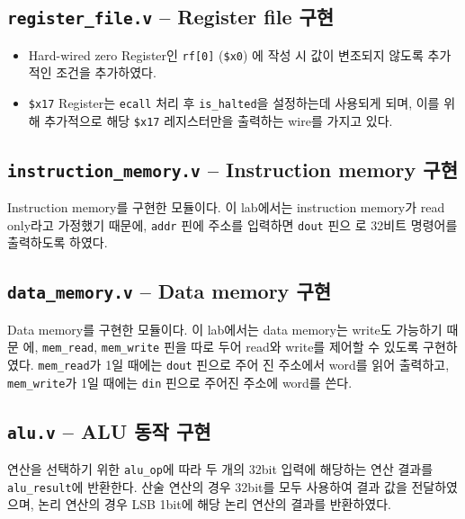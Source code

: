\documentclass{scrartcl}
\begin{document}
\subsection{\texttt{register\_file.v} -- Register file 구현}
\begin{itemize}
    \item Hard-wired zero Register인 \texttt{rf[0]} (\texttt{\$x0}) 에 작성 시 값이 변조되지 않도록
    추가적인 조건을 추가하였다.
    \item \texttt{\$x17} Register는 \texttt{ecall} 처리 후 \texttt{is\_halted}을 설정하는데
    사용되게 되며, 이를 위해 추가적으로 해당 \texttt{\$x17} 레지스터만을 출력하는 wire를 가지고 있다. 
\end{itemize}

\subsection{\texttt{instruction\_memory.v} -- Instruction memory 구현}
Instruction memory를 구현한 모듈이다. 이 lab에서는 instruction memory가 read
only라고 가정했기 때문에, \texttt{addr} 핀에 주소를 입력하면 \texttt{dout} 핀으
로 32비트 명령어를 출력하도록 하였다.

\subsection{\texttt{data\_memory.v} -- Data memory 구현}
Data memory를 구현한 모듈이다. 이 lab에서는 data memory는 write도 가능하기 때문
에, \texttt{mem\_read}, \texttt{mem\_write} 핀을 따로 두어 read와 write를 제어할
수 있도록 구현하였다. \texttt{mem\_read}가 1일 때에는 \texttt{dout} 핀으로 주어
진 주소에서 word를 읽어 출력하고, \texttt{mem\_write}가 1일 때에는 \texttt{din}
핀으로 주어진 주소에 word를 쓴다.

\subsection{\texttt{alu.v} -- ALU 동작 구현}
연산을 선택하기 위한 \texttt{alu\_op}에 따라 두 개의 32bit 입력에 해당하는 연산 결과를 \texttt{alu\_result}에 반환한다.
산술 연산의 경우 32bit를 모두 사용하여 결과 값을 전달하였으며, 논리 연산의 경우 LSB 1bit에 해당 논리 연산의 결과를 반환하였다.
\end{document}
